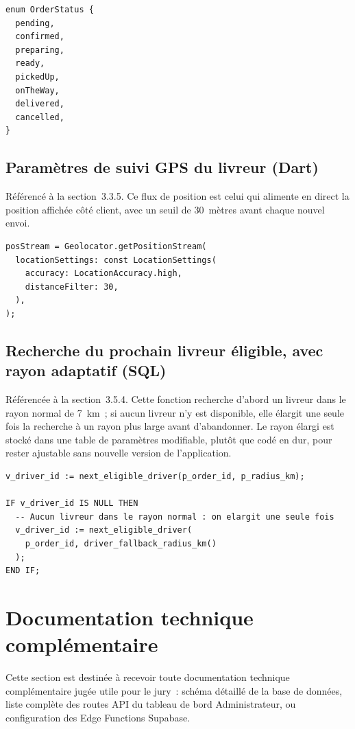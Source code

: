 \documentclass[12pt,fleqn,a4paper]{report}
\begin{document}
\begin{justify}
\begin{verbatim}
enum OrderStatus {
  pending,
  confirmed,
  preparing,
  ready,
  pickedUp,
  onTheWay,
  delivered,
  cancelled,
}
\end{verbatim}

\subsection*{Paramètres de suivi GPS du livreur (Dart)}

Référencé à la section~3.3.5. Ce flux de position est celui qui alimente en direct la position affichée côté client, avec un seuil de 30~mètres avant chaque nouvel envoi.

\begin{verbatim}
posStream = Geolocator.getPositionStream(
  locationSettings: const LocationSettings(
    accuracy: LocationAccuracy.high,
    distanceFilter: 30,
  ),
);
\end{verbatim}

\subsection*{Recherche du prochain livreur éligible, avec rayon adaptatif (SQL)}

Référencée à la section~3.5.4. Cette fonction recherche d'abord un livreur dans le rayon normal de 7~km~; si aucun livreur n'y est disponible, elle élargit une seule fois la recherche à un rayon plus large avant d'abandonner. Le rayon élargi est stocké dans une table de paramètres modifiable, plutôt que codé en dur, pour rester ajustable sans nouvelle version de l'application.

\begin{verbatim}
v_driver_id := next_eligible_driver(p_order_id, p_radius_km);

IF v_driver_id IS NULL THEN
  -- Aucun livreur dans le rayon normal : on elargit une seule fois
  v_driver_id := next_eligible_driver(
    p_order_id, driver_fallback_radius_km()
  );
END IF;
\end{verbatim}

\section*{Documentation technique complémentaire}

Cette section est destinée à recevoir toute documentation technique complémentaire jugée utile pour le jury~: schéma détaillé de la base de données, liste complète des routes API du tableau de bord Administrateur, ou configuration des Edge Functions Supabase.

\end{justify}
\end{document}
